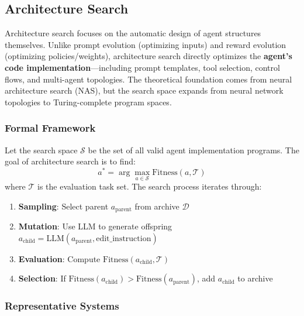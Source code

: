 \subsection{Architecture Search}\label{sec:arch}

Architecture search focuses on the automatic design of agent structures themselves. Unlike prompt evolution (optimizing inputs) and reward evolution (optimizing policies/weights), architecture search directly optimizes the \textbf{agent's code implementation}---including prompt templates, tool selection, control flows, and multi-agent topologies. The theoretical foundation comes from neural architecture search (NAS), but the search space expands from neural network topologies to Turing-complete program spaces.

\subsubsection{Formal Framework}

\begin{definition}
Let the search space $\mathcal{S}$ be the set of all valid agent implementation programs. The goal of architecture search is to find:
\begin{equation}
a^* = \arg\max_{a \in \mathcal{S}} \text{Fitness}(a, \mathcal{T})
\label{eq:arch-search}
\end{equation}
where $\mathcal{T}$ is the evaluation task set. The search process iterates through:
\begin{enumerate}
\item \textbf{Sampling}: Select parent $a_{\mathrm{parent}}$ from archive $\mathcal{D}$
\item \textbf{Mutation}: Use LLM to generate offspring $a_{\mathrm{child}} = \mathrm{LLM}(a_{\mathrm{parent}}, \text{edit\_instruction})$
\item \textbf{Evaluation}: Compute $\text{Fitness}(a_{\mathrm{child}}, \mathcal{T})$
\item \textbf{Selection}: If $\text{Fitness}(a_{\mathrm{child}}) > \text{Fitness}(a_{\mathrm{parent}})$, add $a_{\mathrm{child}}$ to archive
\end{enumerate}
\end{definition}

\subsubsection{Representative Systems}

